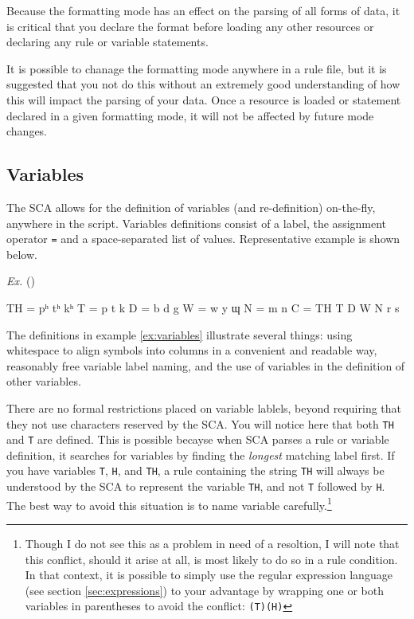 \documentclass[10pt,letterpaper]{article}
\newcounter{excounter}
\newenvironment{vex}[1]{
	\refstepcounter{excounter}
	\noindent\emph{Ex.} (\arabic{excounter}\label{#1})
	\verbatim
}{\endverbatim}
\begin{document}
Because the formatting mode has an effect on the parsing of all forms of data, it is critical that you declare the format before loading any other resources or declaring any rule or variable statements.

It is possible to chanage the formatting mode anywhere in a rule file, but it is suggested that you not do this without an extremely good understanding of how this will impact the parsing of your data. Once a resource is loaded or statement declared in a given formatting mode, it will not be affected by future mode changes.


\subsection{Variables}
\label{sec:variables}
The SCA allows for the definition of variables (and re-definition) on-the-fly, anywhere in the script. Variables definitions consist of a label, the assignment operator \texttt{=} and a space-separated list of values. Representative example is shown below.

\begin{vex}{ex:variables}
TH = pʰ tʰ kʰ
T  = p  t  k
D  = b  d  g
W  = w  y  ɰ
N  = m  n
C  = TH T D W N r s
\end{vex}

The definitions in example \ref{ex:variables} illustrate several things: using whitespace to align symbols into columns in a convenient and readable way, reasonably free variable label naming, and the use of variables in the definition of other variables.

There are no formal restrictions placed on variable lablels, beyond requiring that they not use characters reserved by the SCA. You will notice here that both \texttt{TH} and \texttt{T} are defined. This is possible becayse when SCA parses a rule or variable definition, it searches for variables by finding the \emph{longest} matching label first. If you have variables \texttt{T}, \texttt{H}, and \texttt{TH}, a rule containing the string \texttt{TH} will always be understood by the SCA to represent the variable \texttt{TH}, and not \texttt{T} followed by \texttt{H}. The best way to avoid this situation is to name variable carefully.\footnote{Though I do not see this as a problem in need of a resoltion, I will note that this conflict, should it arise at all, is most likely to do so in a rule condition. In that context, it is possible to simply use the regular expression language (see section \ref{sec:expressions}) to your advantage by wrapping one or both variables in parentheses to avoid the conflict: \texttt{(T)(H)}}
\end{document}
